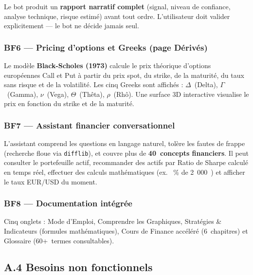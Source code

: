 \documentclass[a4paper, 12pt, twoside]{article}
\begin{document}
    Le bot produit un \textbf{rapport narratif complet} (signal, niveau de
    confiance, analyse technique, risque estimé) avant tout ordre.
    L'utilisateur doit valider explicitement --- le bot ne décide jamais seul.

    \subsubsection*{BF6 --- Pricing d'options et Greeks (page Dérivés)}

    Le modèle \textbf{Black-Scholes (1973)} calcule le prix théorique
    d'options européennes Call et Put à partir du prix spot, du strike, de la
    maturité, du taux sans risque et de la volatilité. Les cinq Greeks sont
    affichés : $\Delta$~(Delta), $\Gamma$~(Gamma), $\nu$~(Vega),
    $\Theta$~(Thêta), $\rho$~(Rhô). Une surface 3D interactive visualise le
    prix en fonction du strike et de la maturité.

    \subsubsection*{BF7 --- Assistant financier conversationnel}

    L'assistant comprend les questions en langage naturel, tolère les fautes
    de frappe (recherche floue via \texttt{difflib}), et couvre plus de
    \textbf{40~concepts financiers}. Il peut consulter le portefeuille actif,
    recommander des actifs par Ratio de Sharpe calculé en temps réel,
    effectuer des calculs mathématiques (ex. ~\% de 2~000~\fg) et
    afficher le taux EUR/USD du moment.

    \subsubsection*{BF8 --- Documentation intégrée}

    Cinq onglets : Mode d'Emploi, Comprendre les Graphiques, Stratégies \&
    Indicateurs (formules mathématiques), Cours de Finance accéléré
    (6~chapitres) et Glossaire (60+~termes consultables).

    \subsection*{A.4 Besoins non fonctionnels}
\end{document}
